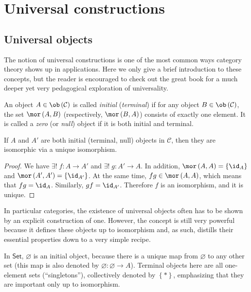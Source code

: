 \section{Universal constructions}

\subsection{Universal objects}

The notion of universal constructions is one of the most common ways category theory shows up in applications. Here we only give a brief introduction to these concepts, but the reader is encouraged to check out the great book \cite{Bergman} for a much deeper yet very pedagogical exploration of universality.
\begin{defn}
    An object $A\in\ob\left(\mathcal{C}\right)$ is called \emph{initial}
    (\emph{terminal}) if for any object $B\in\ob\left(\mathcal{C}\right)$,
    the set $\mor\left(A,B\right)$ (respectively, $\mor\left(B,A\right)$)
    consists of exactly one element. It is called a \emph{zero} (or
    \emph{null}) object if it is both initial and terminal.
\end{defn}
\begin{prop}
    If $A$ and $A'$ are both initial (terminal, null) objects in $\mathcal{C}$,
    then they are isomorphic via a unique isomorphism.
\end{prop}
\begin{proof}
    We have $\exists!\;f:A\to A'$ and $\exists!\;g:A'\to A$. In addition,
    $\mor\left(A,A\right)=\left\{ \id_{A}\right\} $ and $\mor\left(A',A'\right)=\left\{ \id_{A'}\right\} $.
    At the same time, $fg\in\mor\left(A,A\right)$, which means that $fg=\id_{A}$.
    Similarly, $gf=\id_{A'}$. Therefore $f$ is an isomorphism, and it
    is unique.
\end{proof}
In particular categories, the existence of universal objects often has to be shown by an explicit construction of one. However, the concept is still very powerful because it defines these objects up to isomorphism and, as such, distills their essential properties down to a very simple recipe.
\begin{example}
    In $\mathsf{Set}$, $\varnothing$ is an initial object, because there
    is a unique map from $\varnothing$ to any other set (this map is
    also denoted by $\varnothing:\varnothing\to A$). Terminal objects
    here are all one-element sets (``singletons''), collectively denoted
    by $\left\{ \ast\right\} $, emphasizing that they are important only
    up to isomorphism.
\end{example}

